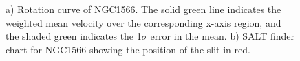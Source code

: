 \begin{figure}[ht]
\centering
  \caption{\small{a) Rotation curve of NGC1566. The solid green line indicates the weighted mean velocity over the corresponding x-axis region, and the shaded green indicates the 1$\sigma$ error in the mean. b) SALT finder chart for NGC1566 showing the position of the slit in red.}}
\vspace{0pt}
\end{figure}







